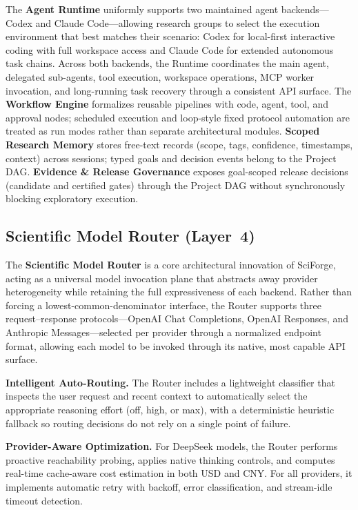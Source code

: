\documentclass[sn-basic,Numbered,pdflatex]{sn-jnl}
\begin{document}
The \textbf{Agent Runtime} uniformly supports two maintained agent backends---Codex and Claude Code---allowing research groups to select the execution environment that best matches their scenario: Codex for local-first interactive coding with full workspace access and Claude Code for extended autonomous task chains. Across both backends, the Runtime coordinates the main agent, delegated sub-agents, tool execution, workspace operations, MCP worker invocation, and long-running task recovery through a consistent API surface. The \textbf{Workflow Engine} formalizes reusable pipelines with code, agent, tool, and approval nodes; scheduled execution and loop-style fixed protocol automation are treated as run modes rather than separate architectural modules. \textbf{Scoped Research Memory} stores free-text records (scope, tags, confidence, timestamps, context) across sessions; typed goals and decision events belong to the Project DAG. \textbf{Evidence \& Release Governance} exposes goal-scoped release decisions (candidate and certified gates) through the Project DAG without synchronously blocking exploratory execution.


\subsection{Scientific Model Router (Layer~4)}
The \textbf{Scientific Model Router} is a core architectural innovation of SciForge, acting as a universal model invocation plane that abstracts away provider heterogeneity while retaining the full expressiveness of each backend. Rather than forcing a lowest-common-denominator interface, the Router supports three request--response protocols---OpenAI Chat Completions, OpenAI Responses, and Anthropic Messages---selected per provider through a normalized endpoint format, allowing each model to be invoked through its native, most capable API surface.

\textbf{Intelligent Auto-Routing.} The Router includes a lightweight classifier that inspects the user request and recent context to automatically select the appropriate reasoning effort (off, high, or max), with a deterministic heuristic fallback so routing decisions do not rely on a single point of failure.

\textbf{Provider-Aware Optimization.} For DeepSeek models, the Router performs proactive reachability probing, applies native thinking controls, and computes real-time cache-aware cost estimation in both USD and CNY. For all providers, it implements automatic retry with backoff, error classification, and stream-idle timeout detection.
\end{document}
